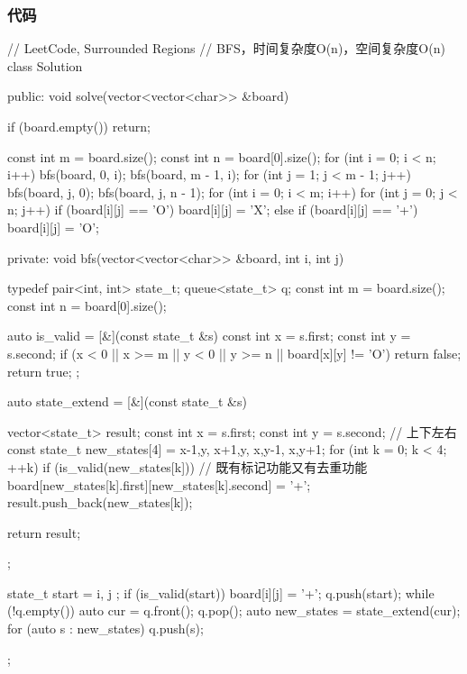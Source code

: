 \subsubsection{代码}
\begin{Code}
// LeetCode, Surrounded Regions
// BFS，时间复杂度O(n)，空间复杂度O(n)
class Solution {
public:
    void solve(vector<vector<char>> &board) {
        if (board.empty()) return;

        const int m = board.size();
        const int n = board[0].size();
        for (int i = 0; i < n; i++) {
            bfs(board, 0, i);
            bfs(board, m - 1, i);
        }
        for (int j = 1; j < m - 1; j++) {
            bfs(board, j, 0);
            bfs(board, j, n - 1);
        }
        for (int i = 0; i < m; i++)
            for (int j = 0; j < n; j++)
                if (board[i][j] == 'O')
                    board[i][j] = 'X';
                else if (board[i][j] == '+')
                    board[i][j] = 'O';
    }
private:
    void bfs(vector<vector<char>> &board, int i, int j) {
        typedef pair<int, int> state_t;
        queue<state_t> q;
        const int m = board.size();
        const int n = board[0].size();

        auto is_valid = [&](const state_t &s) {
            const int x = s.first;
            const int y = s.second;
            if (x < 0 || x >= m || y < 0 || y >= n || board[x][y] != 'O')
                return false;
            return true;
        };

        auto state_extend = [&](const state_t &s) {
            vector<state_t> result;
            const int x = s.first;
            const int y = s.second;
            // 上下左右
            const state_t new_states[4] = {{x-1,y}, {x+1,y},
                    {x,y-1}, {x,y+1}};
            for (int k = 0; k < 4;  ++k) {
                if (is_valid(new_states[k])) {
                    // 既有标记功能又有去重功能
                    board[new_states[k].first][new_states[k].second] = '+';
                    result.push_back(new_states[k]);
                }
            }

            return result;
        };

        state_t start = { i, j };
        if (is_valid(start)) {
            board[i][j] = '+';
            q.push(start);
        }
        while (!q.empty()) {
            auto cur = q.front();
            q.pop();
            auto new_states = state_extend(cur);
            for (auto s : new_states) q.push(s);
        }
    }
};
\end{Code}


